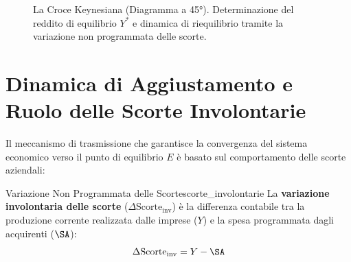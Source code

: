 \begin{figure}[htbp]
\caption{La Croce Keynesiana (Diagramma a 45°). Determinazione del reddito di equilibrio $Y^*$ e dinamica di riequilibrio tramite la variazione non programmata delle scorte.}
\label{fig:croce_keynesiana}
\end{figure}

\section{Dinamica di Aggiustamento e Ruolo delle Scorte Involontarie}

Il meccanismo di trasmissione che garantisce la convergenza del sistema economico verso il punto di equilibrio $E$ è basato sul comportamento delle scorte aziendali:

\begin{definizione}{Variazione Non Programmata delle Scorte}{scorte_involontarie}
La \textbf{variazione involontaria delle scorte} ($\Delta \mathrm{Scorte}_{\text{inv}}$) è la differenza contabile tra la produzione corrente realizzata dalle imprese ($Y$) e la spesa programmata dagli acquirenti ($\SA$):
\begin{equation}
    \Delta \mathrm{Scorte}_{\text{inv}} = Y - \SA
\end{equation}
\end{definizione}

